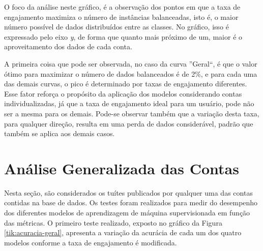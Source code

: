 \documentclass[oneside,openright,12pt]{ufsm_2015} %
\begin{document}
    \par O foco da análise neste gráfico, é a observação dos pontos em que a taxa de engajamento maximiza o número de instâncias balanceadas, isto é, o maior número possível de dados distribuídos entre as classes. No gráfico, isso é expressado pelo eixo \textit{y}, de forma que quanto mais próximo de um, maior é o aproveitamento dos dados de cada conta.
    
    \par A primeira coisa que pode ser observada, no caso da curva ''Geral``, é que o valor ótimo para maximizar o número de dados balanceados é de 2\%, e para cada uma das demais curvas, o pico é determinado por taxas de engajamento diferentes. Esse fator reforça o propósito da aplicação dos modelos considerando contas individualizadas, já que a taxa de engajamento ideal para um usuário, pode não ser a mesma para os demais. Pode-se observar também que a variação desta taxa, para qualquer direção, resulta em uma perda de dados considerável, padrão que também se aplica aos demais casos.
    

\section{Análise Generalizada das Contas}
\label{sec:exp-analise-geral}
    
    \par Nesta seção, são considerados os tuítes publicados por qualquer uma das contas contidas na base de dados. Os testes foram realizados para medir do desempenho dos diferentes modelos de aprendizagem de máquina supervisionada em função das métricas. O primeiro teste realizado, exposto no gráfico da Figura \ref{tik:acuracia-geral}, apresenta a variação da acurácia de cada um dos quatro modelos conforme a taxa de engajamento é modificada.
    
    \mydata
    
\end{document}
